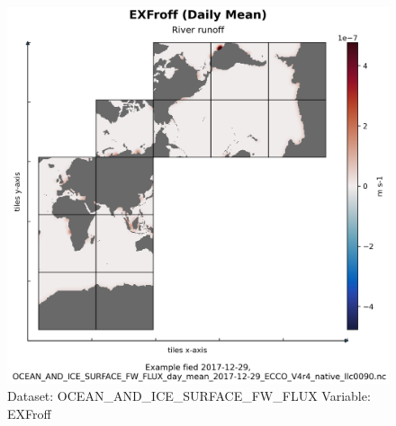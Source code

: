 \begin{figure}[H]
\centering
\includegraphics[scale=0.55]{../images/plots/native_plots/Ocean_and_Sea-Ice_Surface_Freshwater_Fluxes/EXFroff.png}
\caption{Dataset: OCEAN\_AND\_ICE\_SURFACE\_FW\_FLUX Variable: EXFroff}
\label{tab:table-OCEAN_AND_ICE_SURFACE_FW_FLUX_EXFroff-Plot}
\end{figure}
\pagebreak
